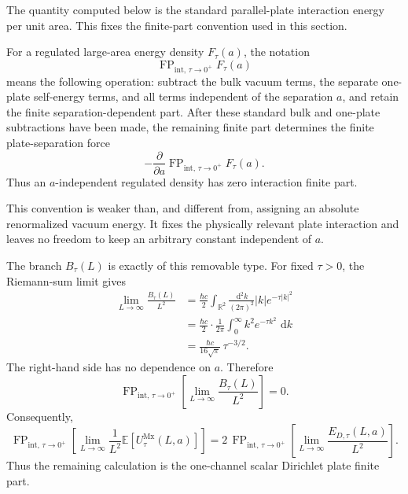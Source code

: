 \documentclass[11pt]{article}
\providecommand{\R}{\mathbb{R}}
\providecommand{\dd}{\,\mathrm{d}}
\providecommand{\hbarc}{\hbar c}
\providecommand{\E}{\mathbb{E}}
\providecommand{\FP}{\operatorname{FP}}
\providecommand{\abs}[1]{\left\lvert #1\right\rvert}
\providecommand{\UtauMx}{U_{\tau}^{\mathrm{Mx}}}
\providecommand{\EDtau}{E_{D,\tau}}
\providecommand{\Btau}{B_{\tau}}
\numberwithin{equation}{section}
\begin{document}
The quantity computed below is the standard parallel-plate interaction energy
per unit area.  This fixes the finite-part convention used in this section.

\begin{definition}
\label{def:parallel-plate-interaction-finite-part}
For a regulated large-area energy density \(F_\tau(a)\), the notation
\[
    \FP_{\mathrm{int},\,\tau\to0^+} F_\tau(a)
\]
means the following operation: subtract the bulk vacuum terms, the separate
one-plate self-energy terms, and all terms independent of the separation
\(a\), and retain the finite separation-dependent part.  After these standard
bulk and one-plate subtractions have been made, the remaining finite part
determines the finite plate-separation force
\[
    -\frac{\partial}{\partial a}
    \FP_{\mathrm{int},\,\tau\to0^+} F_\tau(a).
\]
Thus an \(a\)-independent regulated density has zero interaction finite part.
\end{definition}

This convention is weaker than, and different from, assigning an absolute
renormalized vacuum energy.  It fixes the physically relevant plate
interaction and leaves no freedom to keep an arbitrary constant independent of
\(a\).

The branch \(\Btau(L)\) is exactly of this removable type.  For fixed
\(\tau>0\), the Riemann-sum limit gives
\begin{align}
\label{eq:Btau-large-area-limit-section06}
    \lim_{L\to\infty}\frac{\Btau(L)}{L^2}
    &=
    \frac{\hbarc}{2}
    \int_{\R^2}\frac{\dd^2 k}{(2\pi)^2}
    \abs{k}e^{-\tau\abs{k}^2}  \\
    &=
    \frac{\hbarc}{2}\cdot\frac{1}{2\pi}
    \int_0^\infty k^2e^{-\tau k^2}\,\dd k \\
    &=
    \frac{\hbarc}{16\sqrt\pi}\,\tau^{-3/2} .
\end{align}
The right-hand side has no dependence on \(a\).  Therefore
\begin{equation}
\label{eq:Btau-FPint-zero-section06}
    \FP_{\mathrm{int},\,\tau\to0^+}
    \left[\lim_{L\to\infty}\frac{\Btau(L)}{L^2}\right]
    =0 .
\end{equation}
Consequently,
\begin{equation}
\label{eq:Maxwell-FP-reduces-to-Dirichlet-section06}
    \FP_{\mathrm{int},\,\tau\to0^+}
    \left[\lim_{L\to\infty}\frac{1}{L^2}\E[\UtauMx(L,a)]\right]
    =
    2\,
    \FP_{\mathrm{int},\,\tau\to0^+}
    \left[\lim_{L\to\infty}\frac{\EDtau(L,a)}{L^2}\right].
\end{equation}
Thus the remaining calculation is the one-channel scalar Dirichlet plate
finite part.
\end{document}
